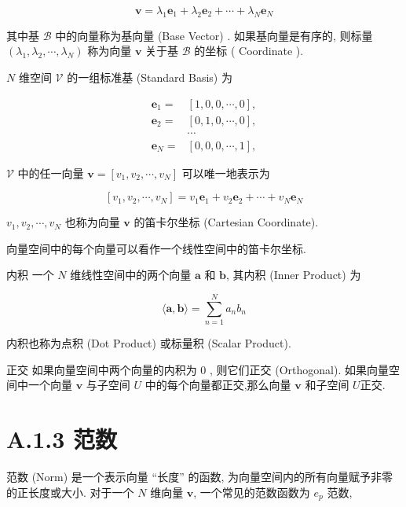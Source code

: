 \documentclass[10pt]{article}
\begin{document}
\begin{equation*}
\boldsymbol{v}=\lambda_{1} \boldsymbol{e}_{1}+\lambda_{2} \boldsymbol{e}_{2}+\cdots+\lambda_{N} \boldsymbol{e}_{N} \tag{A.4}
\end{equation*}


其中基 $\mathcal{B}$ 中的向量称为基向量 (Base Vector) . 如果基向量是有序的, 则标量 $\left(\lambda_{1}, \lambda_{2}, \cdots, \lambda_{N}\right)$ 称为向量 $\boldsymbol{v}$ 关于基 $\mathcal{B}$ 的坐标 ( Coordinate ).

$N$ 维空间 $\mathcal{V}$ 的一组标准基 (Standard Basis) 为


\begin{align*}
\boldsymbol{e}_{1}= & {[1,0,0, \cdots, 0], }  \tag{A.5}\\
\boldsymbol{e}_{2}= & {[0,1,0, \cdots, 0], }  \tag{A.6}\\
& \cdots  \tag{A.7}\\
\boldsymbol{e}_{N}= & {[0,0,0, \cdots, 1], }
\end{align*}


$\mathcal{V}$ 中的任一向量 $\boldsymbol{v}=\left[v_{1}, v_{2}, \cdots, v_{N}\right]$ 可以唯一地表示为


\begin{equation*}
\left[v_{1}, v_{2}, \cdots, v_{N}\right]=v_{1} \boldsymbol{e}_{1}+v_{2} \boldsymbol{e}_{2}+\cdots+v_{N} \boldsymbol{e}_{N} \tag{A.9}
\end{equation*}


$v_{1}, v_{2}, \cdots, v_{N}$ 也称为向量 $\boldsymbol{v}$ 的笛卡尔坐标 (Cartesian Coordinate).

向量空间中的每个向量可以看作一个线性空间中的笛卡尔坐标.

内积 一个 $N$ 维线性空间中的两个向量 $\boldsymbol{a}$ 和 $\boldsymbol{b}$, 其内积 (Inner Product) 为


\begin{equation*}
\langle\boldsymbol{a}, \boldsymbol{b}\rangle=\sum_{n=1}^{N} a_{n} b_{n} \tag{A.10}
\end{equation*}


内积也称为点积 (Dot Product) 或标量积 (Scalar Product).

正交 如果向量空间中两个向量的内积为 0 , 则它们正交 (Orthogonal). 如果向量空间中一个向量 $\boldsymbol{v}$ 与子空间 $U$ 中的每个向量都正交,那么向量 $\boldsymbol{v}$ 和子空间 $U$正交.

\section*{A.1.3 范数}
范数 (Norm) 是一个表示向量 “长度” 的函数, 为向量空间内的所有向量赋予非零的正长度或大小. 对于一个 $N$ 维向量 $\boldsymbol{v}$, 一个常见的范数函数为 $e_{p}$ 范数,
\end{document}
